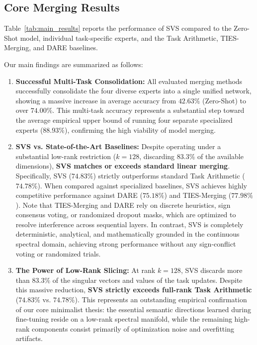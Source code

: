 \subsection{Core Merging Results}

Table~\ref{tab:main_results} reports the performance of SVS compared to the Zero-Shot model, individual task-specific experts, and the Task Arithmetic, TIES-Merging, and DARE baselines. 

Our main findings are summarized as follows:
\begin{enumerate}
    \item \textbf{Successful Multi-Task Consolidation:} All evaluated merging methods successfully consolidate the four diverse experts into a single unified network, showing a massive increase in average accuracy from $42.63\%$ (Zero-Shot) to over $74.00\%$. This multi-task accuracy represents a substantial step toward the average empirical upper bound of running four separate specialized experts ($88.93\%$), confirming the high viability of model merging.
    \item \textbf{SVS vs. State-of-the-Art Baselines:} Despite operating under a substantial low-rank restriction ($k=128$, discarding $83.3\%$ of the available dimensions), \textbf{SVS matches or exceeds standard linear merging}. Specifically, SVS ($74.83\%$) strictly outperforms standard Task Arithmetic ($74.78\%$). When compared against specialized baselines, SVS achieves highly competitive performance against DARE ($75.18\%$) and TIES-Merging ($77.98\%$). Note that TIES-Merging and DARE rely on discrete heuristics, sign consensus voting, or randomized dropout masks, which are optimized to resolve interference across sequential layers. In contrast, SVS is completely deterministic, analytical, and mathematically grounded in the continuous spectral domain, achieving strong performance without any sign-conflict voting or randomized trials.
    \item \textbf{The Power of Low-Rank Slicing:} At rank $k=128$, SVS discards more than $83.3\%$ of the singular vectors and values of the task updates. Despite this massive reduction, \textbf{SVS strictly exceeds full-rank Task Arithmetic} ($74.83\%$ vs. $74.78\%$). This represents an outstanding empirical confirmation of our core minimalist thesis: the essential semantic directions learned during fine-tuning reside on a low-rank spectral manifold, while the remaining high-rank components consist primarily of optimization noise and overfitting artifacts.
\end{enumerate}

